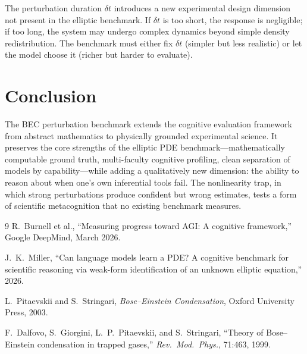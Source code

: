 \documentclass[11pt]{article}
\begin{document}
The perturbation duration $\delta t$ introduces a new experimental design dimension not present in the elliptic benchmark. If $\delta t$ is too short, the response is negligible; if too long, the system may undergo complex dynamics beyond simple density redistribution. The benchmark must either fix $\delta t$ (simpler but less realistic) or let the model choose it (richer but harder to evaluate).

\section{Conclusion}

The BEC perturbation benchmark extends the cognitive evaluation framework from abstract mathematics to physically grounded experimental science. It preserves the core strengths of the elliptic PDE benchmark---mathematically computable ground truth, multi-faculty cognitive profiling, clean separation of models by capability---while adding a qualitatively new dimension: the ability to reason about when one's own inferential tools fail. The nonlinearity trap, in which strong perturbations produce confident but wrong estimates, tests a form of scientific metacognition that no existing benchmark measures.

\begin{thebibliography}{9}
R.~Burnell et al., ``Measuring progress toward AGI: A cognitive framework,'' Google DeepMind, March 2026.

J.~K.~Miller, ``Can language models learn a PDE? A cognitive benchmark for scientific reasoning via weak-form identification of an unknown elliptic equation,'' 2026.

L.~Pitaevskii and S.~Stringari, \textit{Bose--Einstein Condensation}, Oxford University Press, 2003.

F.~Dalfovo, S.~Giorgini, L.~P.~Pitaevskii, and S.~Stringari, ``Theory of Bose--Einstein condensation in trapped gases,'' \textit{Rev.\ Mod.\ Phys.}, 71:463, 1999.
\end{thebibliography}
\end{document}
